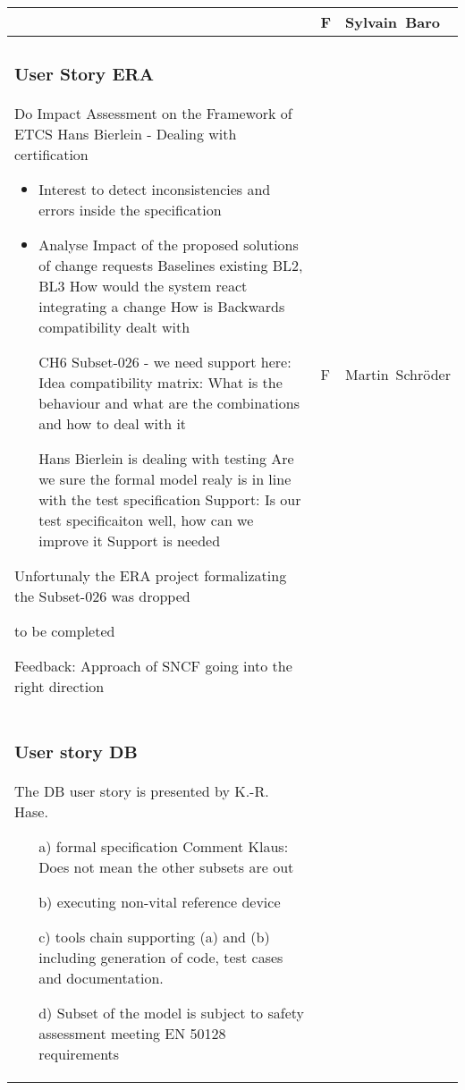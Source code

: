 \documentclass[a4paper]{article}
\begin{document}
\begin{longtable}{|p{}|p{}|p{}|}
& F
& Sylvain\ Baro
\\\hline
\setcounter{subsubsection}{4}
\subsubsection{User Story ERA} %

Do Impact Assessment on the Framework of ETCS
Hans Bierlein - Dealing with certification 

\begin{itemize}
\item{Interest} to detect inconsistencies and errors inside the specification
\item{Analyse Impact} of the proposed solutions of change requests
 Baselines existing BL2, BL3
How would the system react integrating a change
How is Backwards compatibility dealt with

CH6 Subset-026 - we need support here:
Idea compatibility matrix: What is the behaviour and what are the combinations and how to deal with it

Hans Bierlein is dealing with testing
Are we sure the formal model realy is in line with the test  specification
Support: Is our test specificaiton well, how can we improve it
Support is needed
\end{itemize}

Unfortunaly the ERA project formalizating the Subset-026 was dropped %

\newline
to be completed
\newline



Feedback: Approach of SNCF going into the right direction
& F
& Martin\ Schr\"{o}der
\\\hline
\setcounter{subsubsection}{2}
\subsubsection {User story DB} %
The DB user story is presented by K.-R. Hase.

\begin{itemize}
	\item [a)] formal specification
Comment Klaus: Does not mean the other subsets are out
	\item [b)] executing non-vital reference device
	\item [c)] tools chain supporting (a) and (b) including generation of code, test cases and documentation.
	\item [d)] Subset of the model is subject to safety assessment meeting EN 50128 requirements
\end{itemize}


\end{longtable}
\end{document}
